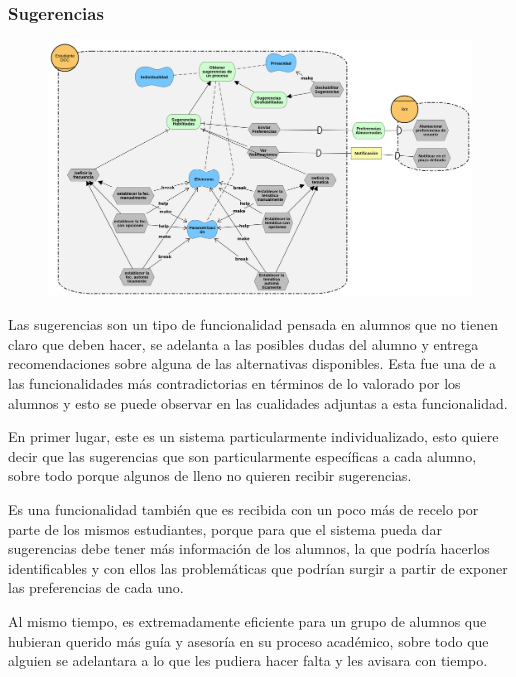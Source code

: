     \subsubsection{Sugerencias}
        \begin{figure}[ht]
            \centering
            \includegraphics[width=\textwidth]{media/imagenes/i_star/diagramas/Sugerencias.png}
            \caption{}
            \label{}
        \end{figure}
        \par Las sugerencias son un tipo de funcionalidad pensada en alumnos que no tienen claro que deben hacer, se adelanta a las posibles dudas del alumno y entrega recomendaciones sobre alguna de las alternativas disponibles. Esta fue una de a las funcionalidades más contradictorias en términos de lo valorado por los alumnos y esto se puede observar en las cualidades adjuntas a esta funcionalidad.
        \par En primer lugar, este es un sistema particularmente individualizado, esto quiere decir que las sugerencias que son particularmente específicas a cada alumno, sobre todo porque algunos de lleno no quieren recibir sugerencias.
        \par Es una funcionalidad también que es recibida con un poco más de recelo por parte de los mismos estudiantes, porque para que el sistema pueda dar sugerencias debe tener más información de los alumnos, la que podría hacerlos identificables y con ellos las problemáticas que podrían surgir a partir de exponer las preferencias de cada uno.
        \par Al mismo tiempo, es extremadamente eficiente para un grupo de alumnos que hubieran querido más guía y asesoría en su proceso académico, sobre todo que alguien se adelantara a lo que les pudiera hacer falta y les avisara con tiempo.
